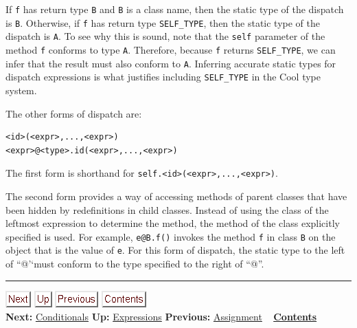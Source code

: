 \documentclass[]{article}
\begin{document}
If \texttt{f} has return type \texttt{B} and \texttt{B} is a class name,
then the static type of the dispatch is \texttt{B}. Otherwise, if
\texttt{f} has return type \texttt{SELF\_TYPE}, then the static type of
the dispatch is \texttt{A}. To see why this is sound, note that the
\texttt{self} parameter of the method \texttt{f} conforms to type
\texttt{A}. Therefore, because \texttt{f} returns \texttt{SELF\_TYPE},
we can infer that the result must also conform to \texttt{A}. Inferring
accurate static types for dispatch expressions is what justifies
including \texttt{SELF\_TYPE} in the Cool type system.

The other forms of dispatch are:

\begin{verbatim}
<id>(<expr>,...,<expr>)
<expr>@<type>.id(<expr>,...,<expr>)
\end{verbatim}

The first form is shorthand for
\texttt{self.\textless{}id\textgreater{}(\textless{}expr\textgreater{},...,\textless{}expr\textgreater{})}.

The second form provides a way of accessing methods of parent classes
that have been hidden by redefinitions in child classes. Instead of
using the class of the leftmost expression to determine the method, the
method of the class explicitly specified is used. For example,
\texttt{e@B.f()} invokes the method \texttt{f} in class \texttt{B} on
the object that is the value of \texttt{e}. For this form of dispatch,
the static type to the left of ``@'`must conform to the type specified
to the right of ``@''.

\begin{center}\rule{3in}{0.4pt}\end{center}

\href{node18.html}{\includegraphics{next.png}}
\href{node13.html}{\includegraphics{up.png}}
\href{node16.html}{\includegraphics{prev.png}}
\href{node1.html}{\includegraphics{contents.png}} \\ \textbf{Next:}
\href{node18.html}{Conditionals} \textbf{Up:}
\href{node13.html}{Expressions} \textbf{Previous:}
\href{node16.html}{Assignment} ~ \textbf{\href{node1.html}{Contents}}
\end{document}

